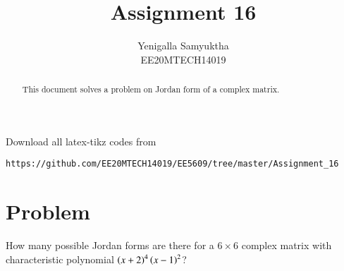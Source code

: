 \documentclass[journal,12pt,twocolumn]{IEEEtran}
\numberwithin{table}{section}
\begin{document}
     \def\rightbox#1{\makebox[0in][r]{#1}}
     \def\centbox#1{\makebox[0in]{#1}}
     \def\topbox#1{\raisebox{-\baselineskip}[0in][0in]{#1}}
     \def\midbox#1{\raisebox{-0.5\baselineskip}[0in][0in]{#1}}
\vspace{3cm}
\title{Assignment 16}
\author{Yenigalla Samyuktha\\EE20MTECH14019}
\maketitle
\newpage
\bigskip
\renewcommand{\thefigure}{\theenumi}
\renewcommand{\thetable}{1}
\setlength{\tabcolsep}{20pt}
\renewcommand{\arraystretch}{1.5}
\begin{abstract}
This document solves a problem on Jordan form of a complex matrix.
\end{abstract}
Download all latex-tikz codes from 
%
\begin{lstlisting}
https://github.com/EE20MTECH14019/EE5609/tree/master/Assignment_16
\end{lstlisting}
%
\section{Problem}
How many possible Jordan forms are there for a $6\times6$ complex matrix with characteristic polynomial $\left(x+2\right)^4\left(x-1\right)^2$?
\end{document}
